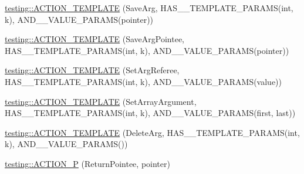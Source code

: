 \begin{DoxyCompactItemize}
\item 
\hyperlink{namespacetesting_a0478a3464d31f6726d5bc47b1be46491}{testing\+::\+A\+C\+T\+I\+O\+N\+\_\+\+T\+E\+M\+P\+L\+A\+TE} (Save\+Arg, H\+A\+S\+\_\+\_\+\+T\+E\+M\+P\+L\+A\+T\+E\+\_\+\+P\+A\+R\+A\+MS(int, k), A\+N\+D\+\_\+\_\+\+V\+A\+L\+U\+E\+\_\+\+P\+A\+R\+A\+MS(pointer))
\item 
\hyperlink{namespacetesting_a31565a90ad7f08c1a88e4b138957172c}{testing\+::\+A\+C\+T\+I\+O\+N\+\_\+\+T\+E\+M\+P\+L\+A\+TE} (Save\+Arg\+Pointee, H\+A\+S\+\_\+\_\+\+T\+E\+M\+P\+L\+A\+T\+E\+\_\+\+P\+A\+R\+A\+MS(int, k), A\+N\+D\+\_\+\_\+\+V\+A\+L\+U\+E\+\_\+\+P\+A\+R\+A\+MS(pointer))
\item 
\hyperlink{namespacetesting_adfd3c9538285d257370f955aa81488f1}{testing\+::\+A\+C\+T\+I\+O\+N\+\_\+\+T\+E\+M\+P\+L\+A\+TE} (Set\+Arg\+Referee, H\+A\+S\+\_\+\_\+\+T\+E\+M\+P\+L\+A\+T\+E\+\_\+\+P\+A\+R\+A\+MS(int, k), A\+N\+D\+\_\+\_\+\+V\+A\+L\+U\+E\+\_\+\+P\+A\+R\+A\+MS(value))
\item 
\hyperlink{namespacetesting_a2b0f090219db3bb0630d5ce6f7d911d8}{testing\+::\+A\+C\+T\+I\+O\+N\+\_\+\+T\+E\+M\+P\+L\+A\+TE} (Set\+Array\+Argument, H\+A\+S\+\_\+\_\+\+T\+E\+M\+P\+L\+A\+T\+E\+\_\+\+P\+A\+R\+A\+MS(int, k), A\+N\+D\+\_\+\_\+\+V\+A\+L\+U\+E\+\_\+\+P\+A\+R\+A\+MS(first, last))
\item 
\hyperlink{namespacetesting_a37a5ebfe68fd8dedf8bd82a5ebddcb7b}{testing\+::\+A\+C\+T\+I\+O\+N\+\_\+\+T\+E\+M\+P\+L\+A\+TE} (Delete\+Arg, H\+A\+S\+\_\+\_\+\+T\+E\+M\+P\+L\+A\+T\+E\+\_\+\+P\+A\+R\+A\+MS(int, k), A\+N\+D\+\_\+\_\+\+V\+A\+L\+U\+E\+\_\+\+P\+A\+R\+A\+MS())
\item 
\hyperlink{namespacetesting_a3d58f0d746946064154cd257d368599d}{testing\+::\+A\+C\+T\+I\+O\+N\+\_\+P} (Return\+Pointee, pointer)
\end{DoxyCompactItemize}
